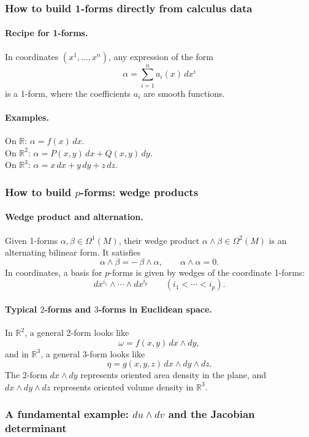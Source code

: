 \documentclass[12pt,a4paper]{article}
\theoremstyle{plain}
\theoremstyle{definition}      %
\begin{document}
\subsubsection*{How to build 1-forms directly from calculus data}

\paragraph{Recipe for 1-forms.}
In coordinates $(x^1,\dots,x^n)$, any expression of the form
\[
\alpha = \sum_{i=1}^n a_i(x)\,dx^i
\]
is a 1-form, where the coefficients $a_i$ are smooth functions.

\paragraph{Examples.}
On $\mathbb{R}$: $\alpha=f(x)\,dx$. \\
On $\mathbb{R}^2$: $\alpha=P(x,y)\,dx+Q(x,y)\,dy$. \\
On $\mathbb{R}^3$: $\alpha = x\,dx+y\,dy+z\,dz$.

\subsubsection*{How to build $p$-forms: wedge products}

\paragraph{Wedge product and alternation.}
Given 1-forms $\alpha,\beta\in\Omega^1(M)$, their wedge product $\alpha\wedge\beta\in\Omega^2(M)$ is an alternating
bilinear form. It satisfies
\[
\alpha\wedge\beta = -\,\beta\wedge\alpha,\qquad \alpha\wedge\alpha=0.
\]
In coordinates, a basis for $p$-forms is given by wedges of the coordinate 1-forms:
\[
dx^{i_1}\wedge\cdots\wedge dx^{i_p}\qquad (i_1<\cdots<i_p).
\]

\paragraph{Typical $2$-forms and $3$-forms in Euclidean space.}
In $\mathbb{R}^2$, a general 2-form looks like
\[
\omega = f(x,y)\,dx\wedge dy,
\]
and in $\mathbb{R}^3$, a general 3-form looks like
\[
\eta = g(x,y,z)\,dx\wedge dy\wedge dz.
\]
The 2-form $dx\wedge dy$ represents oriented area density in the plane, and $dx\wedge dy\wedge dz$
represents oriented volume density in $\mathbb{R}^3$.

\subsubsection*{A fundamental example: $du\wedge dv$ and the Jacobian determinant}
\end{document}
